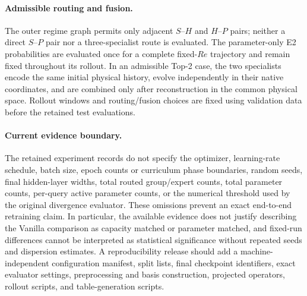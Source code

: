 \paragraph{Admissible routing and fusion.}
The outer regime graph permits only adjacent $S$--$H$ and $H$--$P$ pairs; neither a direct $S$--$P$ pair nor a three-specialist route is evaluated. The parameter-only E2 probabilities are evaluated once for a complete fixed-$Re$ trajectory and remain fixed throughout its rollout. In an admissible Top-2 case, the two specialists encode the same initial physical history, evolve independently in their native coordinates, and are combined only after reconstruction in the common physical space. Rollout windows and routing/fusion choices are fixed using validation data before the retained test evaluations.

\paragraph{Current evidence boundary.}
The retained experiment records do not specify the optimizer, learning-rate schedule, batch size, epoch counts or curriculum phase boundaries, random seeds, final hidden-layer widths, total routed group/expert counts, total parameter counts, per-query active parameter counts, or the numerical threshold used by the original divergence evaluator. These omissions prevent an exact end-to-end retraining claim. In particular, the available evidence does not justify describing the Vanilla comparison as capacity matched or parameter matched, and fixed-run differences cannot be interpreted as statistical significance without repeated seeds and dispersion estimates. A reproducibility release should add a machine-independent configuration manifest, split lists, final checkpoint identifiers, exact evaluator settings, preprocessing and basis construction, projected operators, rollout scripts, and table-generation scripts.
